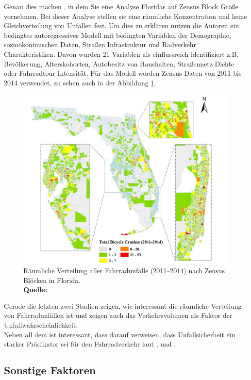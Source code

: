 \documentclass[a4paper,12pt]{thesis}
\newcommand*{\captionsource}[2]{%
	\caption[{#1}]{%
		#1%
		\\\hspace{\linewidth}%
		\textbf{Quelle:} #2%
	}%
}
\begin{document}
Genau dies machen \cite{Saha2018}, in dem Sie eine Analyse Floridas auf Zensus Block Größe vornehmen. Bei dieser Analyse stellen sie eine räumliche Konzentration und keine Gleichverteilung von Unfällen fest. Um dies zu erklären nutzen die Autoren ein bedingtes autoregressives Modell mit bedingten Variablen der Demographie, sozioökonimischen Daten, Straßen Infrastruktur und Radverkehr Charakteristiken. Davon wurden 21 Variablen als einflussreich identifiziert z.B. Bevölkerung, Alterskohorten, Autobesitz von Haushalten, Straßennetz Dichte oder Fahrradtour Intensität. Für das Modell worden Zensus Daten von 2011 bis 2014 verwendet, zu sehen auch in der Abbildung \ref{SAHA}.  
\begin{figure}[!ht]
	\centering
	\includegraphics[width=\textwidth]{Plots/saha.png}
	\captionsource{Räumliche Verteilung aller Fahrradunfälle (2011–2014) nach Zensus Blöcken in Florida.}{
		\cite{Saha2018}
	}
	\label{SAHA}
\end{figure}
Gerade die letzten zwei Studien zeigen, wie interessant die räumliche Verteilung von Fahrradunfällen ist und \cite{Kondo2018} zeigen auch das Verkehrsvolumen als Faktor der Unfallwahrscheinlichkeit.\\
Neben all dem ist interessant, dass \cite{Kondo2018} darauf verweisen, dass Unfallsicherheit ein starker Prädikator sei für den Fahrradverkehr laut \cite{Pucher2010}, \cite{Thomas2013} und \cite{Winters2010}.

\subsection{Sonstige Faktoren}
\end{document}

